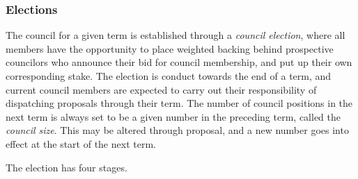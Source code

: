 \documentclass{article}
\begin{document}
\subsubsection{Elections}

The council for a given term is established through a \textit{council election}, where all members have the opportunity to place weighted backing behind prospective councilors who announce their bid for council membership, and put up their own corresponding stake. The election is conduct towards the end of a term, and current council members are expected to carry out their responsibility of dispatching proposals through their term. The number of council positions in the next term is always set to be a given number in the preceding term, called the \textit{council size}. This may be altered through proposal, and a new number goes into effect at the start of the next term.

The election has four stages.
\end{document}
